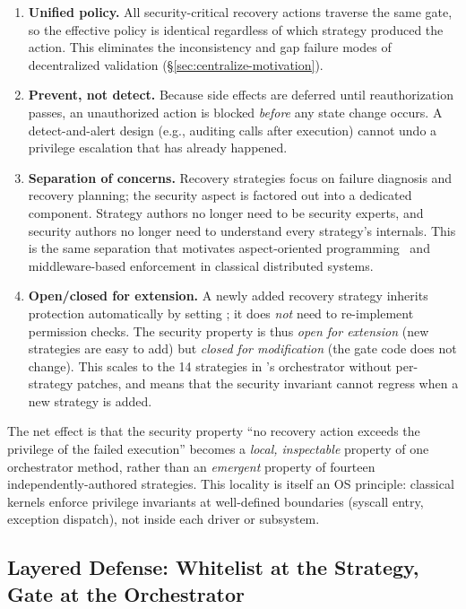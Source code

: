 \begin{enumerate}[leftmargin=*]
    \item \textbf{Unified policy.} All security-critical recovery actions traverse the same gate, so the effective policy is identical regardless of which strategy produced the action. This eliminates the inconsistency and gap failure modes of decentralized validation (\S\ref{sec:centralize-motivation}).
    \item \textbf{Prevent, not detect.} Because side effects are deferred until reauthorization passes, an unauthorized action is blocked \emph{before} any state change occurs. A detect-and-alert design (e.g., auditing  calls after execution) cannot undo a privilege escalation that has already happened.
    \item \textbf{Separation of concerns.} Recovery strategies focus on failure diagnosis and recovery planning; the security aspect is factored out into a dedicated component. Strategy authors no longer need to be security experts, and security authors no longer need to understand every strategy's internals. This is the same separation that motivates aspect-oriented programming~\cite{aspectj} and middleware-based enforcement in classical distributed systems.
    \item \textbf{Open/closed for extension.} A newly added recovery strategy inherits protection automatically by setting ; it does \emph{not} need to re-implement permission checks. The security property is thus \emph{open for extension} (new strategies are easy to add) but \emph{closed for modification} (the gate code does not change). This scales to the 14 strategies in \system{}'s orchestrator without per-strategy patches, and means that the security invariant cannot regress when a new strategy is added.
\end{enumerate}

The net effect is that the security property ``no recovery action exceeds the privilege of the failed execution'' becomes a \emph{local, inspectable} property of one orchestrator method, rather than an \emph{emergent} property of fourteen independently-authored strategies. This locality is itself an OS principle: classical kernels enforce privilege invariants at well-defined boundaries (syscall entry, exception dispatch), not inside each driver or subsystem.

\subsection{Layered Defense: Whitelist at the Strategy, Gate at the Orchestrator}
\label{sec:layered-defense}

